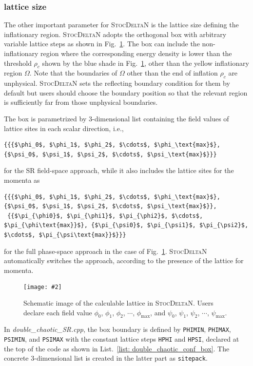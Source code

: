 \documentclass[aps, prd
, preprint
, nofootinbib 
, notitlepage
, superscriptaddress
, longbibliography
]{revtex4-1}
\newcommand{\bfe}[4]{
\begin{figure} 
	\centering
	\texttt{[image: \#2]}
	\caption{#3}
	\label{#4}
\end{figure}}
\begin{document}
\subsubsection{lattice size}

The other important parameter for \textsc{StocDeltaN} is the lattice size defining the inflationary region.
\textsc{StocDeltaN} adopts the orthogonal box with arbitrary variable lattice steps as shown in Fig.~\ref{fig: box}.
The box can include the non-inflationary region where the corresponding energy density is lower than the threshold $\rho_c$
shown by the blue shade in Fig.~\ref{fig: box}, other than the yellow inflationary region $\Omega$.
Note that the boundaries of $\Omega$ other than the end of inflation $\rho_c$ are unphysical. \textsc{StocDeltaN} sets the reflecting boundary condition for them by default but users should choose the boundary position so that the relevant region is sufficiently far from those unphysical boundaries.

The box is parametrized by 3-dimensional list containing the field values of lattice sites in each scalar direction, i.e.,
\begin{lstlisting}[numbers = none, mathescape]
{{{$\phi_0$, $\phi_1$, $\phi_2$, $\cdots$, $\phi_\text{max}$}, {$\psi_0$, $\psi_1$, $\psi_2$, $\cdots$, $\psi_\text{max}$}}}
\end{lstlisting}
for the SR field-space approach, while it also includes the lattice sites for the momenta as
\begin{lstlisting}[numbers = none, mathescape]
{{{$\phi_0$, $\phi_1$, $\phi_2$, $\cdots$, $\phi_\text{max}$}, {$\psi_0$, $\psi_1$, $\psi_2$, $\cdots$, $\psi_\text{max}$}},
 {{$\pi_{\phi0}$, $\pi_{\phi1}$, $\pi_{\phi2}$, $\cdots$, $\pi_{\phi\text{max}}$}, {$\pi_{\psi0}$, $\pi_{\psi1}$, $\pi_{\psi2}$, $\cdots$, $\pi_{\psi\text{max}}$}}}
\end{lstlisting}
for the full phase-space approach
in the case of Fig.~\ref{fig: box}.
\textsc{StocDeltaN} automatically switches the approach, according to the presence of the lattice for momenta.

\bfe{width=0.9\hsize}{figs/box.pdf}{Schematic image of the calculable lattice in \textsc{StocDeltaN}. Users declare each field value 
$\phi_0$, $\phi_1$, $\phi_2$, $\cdots$, $\phi_\text{max}$, and $\psi_0$, $\psi_1$, $\psi_2$, $\cdots$, $\psi_\text{max}$.}{fig: box}

In \textit{double\_chaotic\_SR.cpp}, the box boundary is defined by \texttt{PHIMIN}, \texttt{PHIMAX}, \texttt{PSIMIN}, and \texttt{PSIMAX}
with the constant lattice steps \texttt{HPHI} and \texttt{HPSI}, declared at the top of the code as shown in List.~\ref{list: double_chaotic_conf_box}.
The concrete 3-dimensional list is created in the latter part as \texttt{sitepack}.
\end{document}
